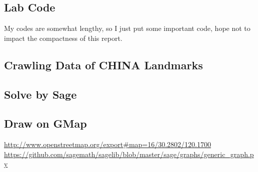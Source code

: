 \documentclass{mcmthesis}
\begin{document}
\begin{appendices}
\section{Lab Code}
My codes are somewhat lengthy, so I just put some important code, hope not to impact the compactness of this report. 
	\subsection{Crawling Data of CHINA Landmarks}
	
	\subsection{Solve by Sage} \label{code:sage}
	
	
	\subsection{Draw on GMap}
		
	
	
%					
\end{appendices}

\begin{thebibliography}{99}
	 \url{http://www.openstreetmap.org/export#map=16/30.2802/120.1700}
	 \url{https://github.com/sagemath/sagelib/blob/master/sage/graphs/generic_graph.py}	
	
\end{thebibliography}
	
\end{document}
